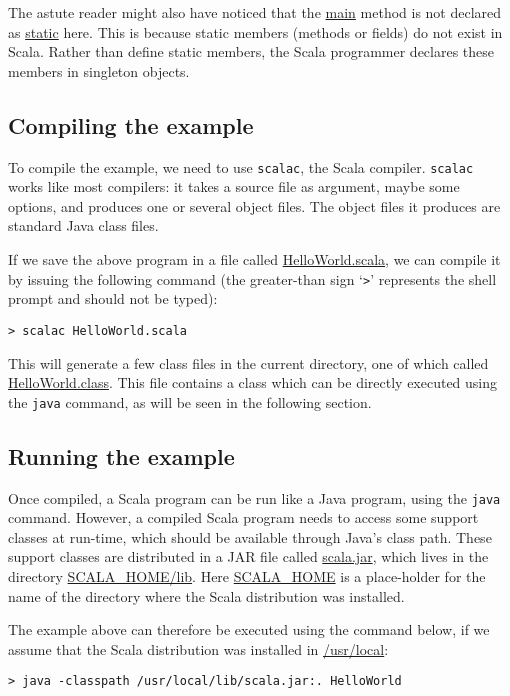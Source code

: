 \documentclass[a4paper,12pt]{article}
\newcommand{\langname}[1]{#1\xspace}
\newcommand{\Scala}{\langname{Scala}}
\newcommand{\Java}{\langname{Java}}
\newcommand{\toolname}[1]{\texttt{#1}\xspace}
\newcommand{\scalac}{\toolname{scalac}}
\newcommand{\java}{\toolname{java}}
\newcommand{\ident}[1]{\url{#1}\xspace}
\begin{document}
The astute reader might also have noticed that the \ident{main} method
is not declared as \ident{static} here. This is because static members
(methods or fields) do not exist in \Scala. Rather than define static
members, the \Scala programmer declares these members in singleton
objects.

\subsection{Compiling the example}
\label{sec:compiling-example}

To compile the example, we need to use \scalac, the \Scala compiler.
\scalac works like most compilers: it takes a source file as argument,
maybe some options, and produces one or several object files. The
object files it produces are standard \Java class files.

If we save the above program in a file called
\ident{HelloWorld.scala}, we can compile it by issuing the following
command (the greater-than sign `\verb|>|' represents the shell prompt
and should not be typed):
\begin{verbatim}
> scalac HelloWorld.scala
\end{verbatim}
This will generate a few class files in the current directory, one of
which called \ident{HelloWorld.class}. This file contains a class
which can be directly executed using the \java command, as will be
seen in the following section.

\subsection{Running the example}
\label{sec:running-example}

Once compiled, a \Scala program can be run like a \Java program, using
the \java command. However, a compiled \Scala program needs to access
some support classes at run-time, which should be available through
\Java's class path. These support classes are distributed in a JAR
file called \url{scala.jar}, which lives in the directory
\url{SCALA_HOME/lib}. Here \url{SCALA_HOME} is a place-holder for the
name of the directory where the \Scala distribution was installed.

The example above can therefore be executed using the command below,
if we assume that the \Scala distribution was installed in
\url{/usr/local}:
\begin{verbatim}
> java -classpath /usr/local/lib/scala.jar:. HelloWorld
\end{verbatim}
\end{document}
